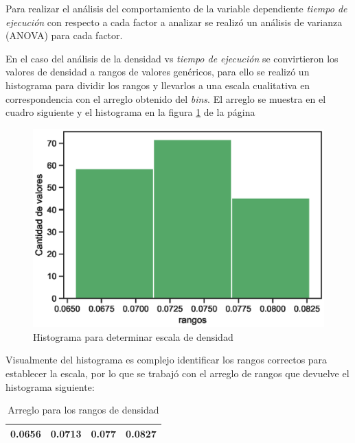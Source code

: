 \documentclass{article}
\begin{document}
Para realizar el análisis del comportamiento de la variable dependiente \textit{tiempo de ejecución} con respecto a cada factor a analizar se realizó un análisis de varianza (ANOVA) para cada factor.

En el caso del análisis de la densidad vs \textit{tiempo de ejecución} se convirtieron los valores de densidad  a rangos de valores genéricos, para ello se realizó un histograma para dividir los rangos y llevarlos a una escala cualitativa en correspondencia con el arreglo obtenido del \textit{bins}. El arreglo se muestra en el cuadro siguiente y el histograma en la figura \ref{fig:Fig1} de la página \pageref{fig:Fig1}

\begin{figure}[htbp]
    \centering
    \includegraphics[scale=0.6]{Imagenes/Histogramadensidad.eps}
    \caption{Histograma para determinar escala de densidad}
    \label{fig:Fig1}
\end{figure}

Visualmente del histograma es complejo identificar los rangos correctos para establecer la escala, por lo que se trabajó con el arreglo de rangos que devuelve el histograma siguiente:

\begin{table}[htbp]
  \centering
  \caption{Arreglo para los rangos de densidad}
    \begin{tabular}{cccc}
    \toprule
    0.0656 & 0.0713 & 0.077 & 0.0827 \\
    \bottomrule
    \end{tabular}%
  \label{tab:addlabel}%
\end{table}%
\end{document}
